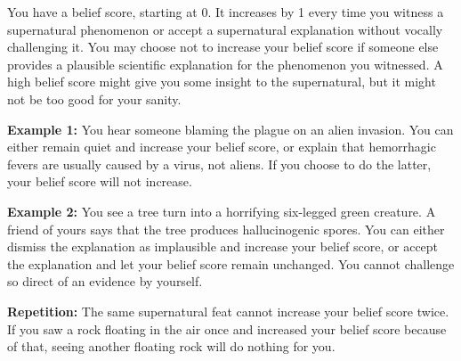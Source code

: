 \documentclass[green]{Pestilence}
\begin{document}
\name{\gBelief{}}

You have a belief score, starting at 0. It increases by 1 every time you witness a supernatural phenomenon or accept a supernatural explanation without vocally challenging it. You may choose not to increase your belief score if someone else provides a plausible scientific explanation for the phenomenon you witnessed. A high belief score might give you some insight to the supernatural, but it might not be too good for your sanity.

{\bf Example 1:} You hear someone blaming the plague on an alien invasion. You can either remain quiet and increase your belief score, or explain that hemorrhagic fevers are usually caused by a virus, not aliens. If you choose to do the latter, your belief score will not increase.

{\bf Example 2:} You see a tree turn into a horrifying six-legged green creature. A friend of yours says that the tree produces hallucinogenic spores. You can either dismiss the explanation as implausible and increase your belief score, or accept the explanation and let your belief score remain unchanged. You cannot challenge so direct of an evidence by yourself.

{\bf Repetition:} The same supernatural feat cannot increase your belief score twice. If you saw a rock floating in the air once and increased your belief score because of that, seeing another floating rock will do nothing for you. 
\end{document}
